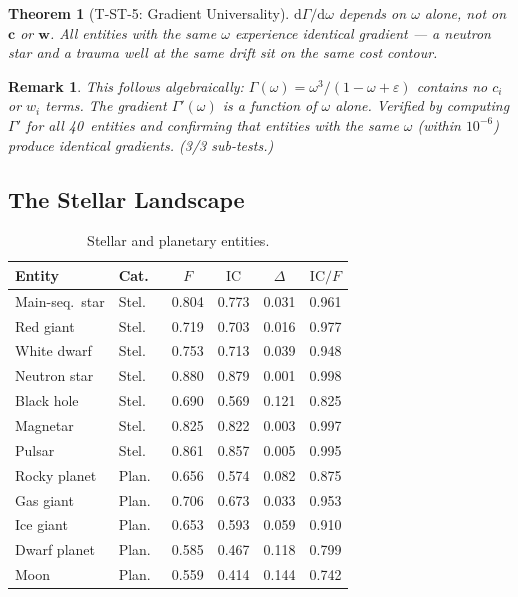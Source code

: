 \documentclass[
  aps,
  prd,
  twocolumn,
  superscriptaddress,
  nofootinbib,
  floatfix
]{revtex4-2}
\newtheorem{theorem}{Theorem}
\newtheorem{remark}{Remark}
\newcommand{\Gam}{\Gamma}
\newcommand{\eps}{\varepsilon}
\newcommand{\dd}{\mathrm{d}}
\newcommand{\tvec}{\mathbf{c}}
\newcommand{\wvec}{\mathbf{w}}
\newcommand{\IC}{\mathrm{IC}}
\begin{document}
\begin{theorem}[T-ST-5: Gradient Universality]\label{thm:T5}
$\dd\Gam/\dd\omega$ depends on $\omega$ alone, not on
$\tvec$ or $\wvec$.  All entities with the same $\omega$
experience identical gradient --- a neutron star and a
trauma well at the same drift sit on the same cost contour.
\end{theorem}

\begin{remark}
This follows algebraically: $\Gam(\omega) = \omega^3/
(1 - \omega + \eps)$ contains no $c_i$ or $w_i$
terms.  The gradient $\Gam'(\omega)$ is a function of
$\omega$ alone.  Verified by computing $\Gam'$ for all
40~entities and confirming that entities with the same
$\omega$ (within $10^{-6}$) produce identical gradients.
(3/3 sub-tests.)
\end{remark}

\subsection{The Stellar Landscape}

\begin{table}[htbp]
\caption{\label{tab:stellar}Stellar and planetary entities.}
\begin{ruledtabular}
\begin{tabular}{llcccc}
Entity & Cat.\ & $F$ & $\IC$ & $\Delta$ & $\IC/F$ \\
\hline
Main-seq.\ star   & Stel.\ & 0.804 & 0.773 & 0.031 & 0.961 \\
Red giant          & Stel.\ & 0.719 & 0.703 & 0.016 & 0.977 \\
White dwarf        & Stel.\ & 0.753 & 0.713 & 0.039 & 0.948 \\
Neutron star       & Stel.\ & 0.880 & 0.879 & 0.001 & 0.998 \\
Black hole         & Stel.\ & 0.690 & 0.569 & 0.121 & 0.825 \\
Magnetar           & Stel.\ & 0.825 & 0.822 & 0.003 & 0.997 \\
Pulsar             & Stel.\ & 0.861 & 0.857 & 0.005 & 0.995 \\
\hline
Rocky planet       & Plan.\ & 0.656 & 0.574 & 0.082 & 0.875 \\
Gas giant          & Plan.\ & 0.706 & 0.673 & 0.033 & 0.953 \\
Ice giant          & Plan.\ & 0.653 & 0.593 & 0.059 & 0.910 \\
Dwarf planet       & Plan.\ & 0.585 & 0.467 & 0.118 & 0.799 \\
Moon               & Plan.\ & 0.559 & 0.414 & 0.144 & 0.742 \\
\end{tabular}
\end{ruledtabular}
\end{table}
\end{document}
